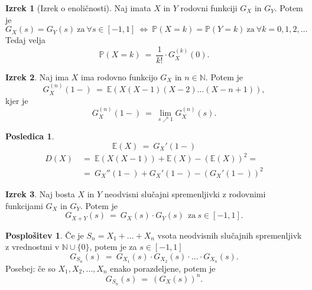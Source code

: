 \documentclass[11pt]{article}
\theoremstyle{definition}
\theoremstyle{definition}
\theoremstyle{definition}
\newtheorem{izrek}{Izrek}[section]
\newtheorem*{posledica}{Posledica}
\newtheorem*{posplošitev}{Posplošitev}
\begin{document}
\begin{izrek}[Izrek o enoličnosti]

Naj imata $X$ in $Y$ rodovni funkciji $G_X$ in $G_Y$. Potem je
$$G_X(s) = G_Y(s) ~\text{za}~ \forall s \in [-1, 1] ~\Leftrightarrow~ \mathbb{P}(X=k) = \mathbb{P}(Y=k) ~\text{za}~ \forall k = 0, 1, 2, \ldots $$
Tedaj velja
$$\mathbb{P}(X = k) ~=~ \frac{1}{k!} \cdot G_X^{(k)}(0).$$

\end{izrek}
\vspace{0.5cm}

\begin{izrek}

Naj ima $X$ ima rodovno funkcijo $G_X$ in $n \in \mathbb{N}$. Potem je 
$$G_X^{(n)}(1-) ~=~ \mathbb{E}(X(X-1)(X-2)\ldots(X-n+1)),$$
kjer je 
$$G_X^{(n)}(1-) ~=~ \lim_{s \nearrow 1} G_X^{(n)}(s).$$

\end{izrek}
\vspace{0.5cm}

\begin{posledica}

$$\mathbb{E}(X) ~=~ G_X'(1-)$$
\begin{align*}
	D(X) ~&=~ \mathbb{E}(X(X-1)) + \mathbb{E}(X) - (\mathbb{E}(X))^2 = \\
	&=~ G_X''(1-) + G_X'(1-) - (G_X'(1-))^2
\end{align*}

\end{posledica}
\vspace{0.5cm}

\begin{izrek}

Naj bosta $X$ in $Y$ neodvisni slučajni spremenljivki z rodovnimi funkcijami $G_X$ in $G_Y$. Potem je 
$$G_{X+Y}(s) ~=~ G_X(s) \cdot G_Y(s) ~~\text{za}~ s \in [-1, 1].$$

\end{izrek}
\vspace{0.5cm}

\begin{posplošitev}

Če je $S_n = X_1 + \ldots + X_n$ vsota neodvisnih slučajnih spremenljivk z vrednostmi v $\mathbb{N} \cup \{0\}$, potem je za $s \in [-1, 1]$
$$G_{S_n}(s) ~=~ G_{X_1}(s) \cdot G_{X_2}(s) \cdot \ldots \cdot G_{X_n}(s).$$
Posebej: če so $X_1, X_2, \ldots, X_n$ enako porazdeljene, potem je
$$G_{S_n}(s) ~=~ (G_X(s))^n.$$ 

\end{posplošitev}
\vspace{0.5cm}
\end{document}
